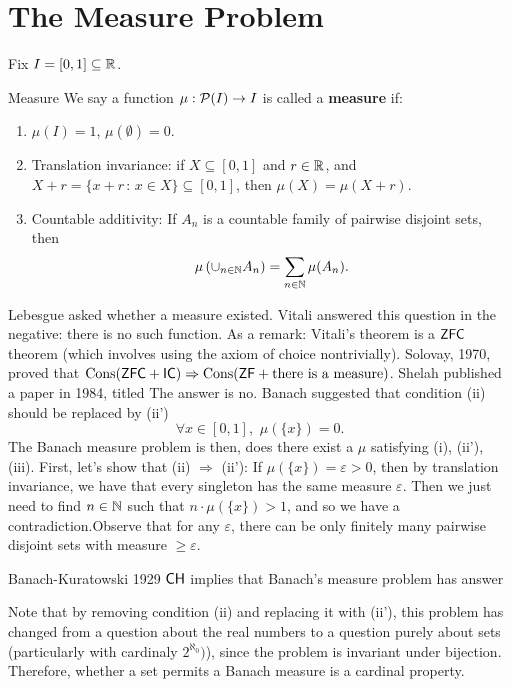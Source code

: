 \documentclass{article}
\begin{document}
\section{The Measure Problem}
Fix $I = [0,1] \subseteq \mathbb{R}$. 
\begin{fancydefine}{Measure} 
    We say a function $\mu : \mathcal{P}(I) \to I$ is called a \textbf{measure} if: \begin{enumerate}
        \item[(i)] $\mu(I)=1$, $\mu(\emptyset)=0$.
        \item[(ii)] Translation invariance: if $X \subseteq [0,1]$ and $r \in \mathbb{R}$, and $X+r = \{ x+r \, : \, x \in X\} \subseteq [0,1]$, then $\mu(X) = \mu(X+r)$.
        \item[(iii)] Countable additivity: If $A_{n}$ is a countable family of pairwise disjoint sets, then \[ \mu\left( \cup_{n \in \mathbb{N}} A_{n}\right) = \sum_{n \in \mathbb{N}} \mu(A_{n}).\] 
    \end{enumerate}
\end{fancydefine}
Lebesgue asked whether a measure existed. Vitali answered this question in the negative: there is no such function. As a remark: Vitali's theorem is a $\mathsf{ZFC}$ theorem (which involves using the axiom of choice nontrivially). Solovay, 1970, proved that $\operatorname{Cons}(\mathsf{ZFC} + \mathsf{IC}) \Rightarrow \operatorname{Cons}(\mathsf{ZF} + \text{there is a measure})$. Shelah published a paper in 1984, titled  The answer is no. \gap
\newlec  
Banach suggested that condition (ii) should be replaced by (ii') \[ \forall x \in [0,1], \,\, \mu(\{x\})=0.\]
The Banach measure problem is then, does there exist a $\mu$ satisfying (i), (ii'), (iii). \gap 
First, let's show that (ii) $\Rightarrow$ (ii'): If $\mu(\{x\})=\varepsilon>0$, then by translation invariance, we have that every singleton has the same measure $\varepsilon$. Then we just need to find $n \in \mathbb{N}$ such that $n \cdot \mu(\{x\}) >1$, and so we have a contradiction.\gap Observe that for any $\varepsilon$, there can be only finitely many pairwise disjoint sets with measure $\geq \varepsilon$.
\begin{fancythm}{Banach-Kuratowski 1929}
    $\mathsf{CH}$ implies that Banach's measure problem has answer 
\end{fancythm}
Note that by removing condition (ii) and replacing it with (ii'), this problem has changed from a question about the real numbers to a question purely about sets (particularly with cardinaly $2^{\aleph_{0}})$), since the problem is invariant under bijection. Therefore, whether a set permits a Banach measure is a cardinal property.
\end{document}
